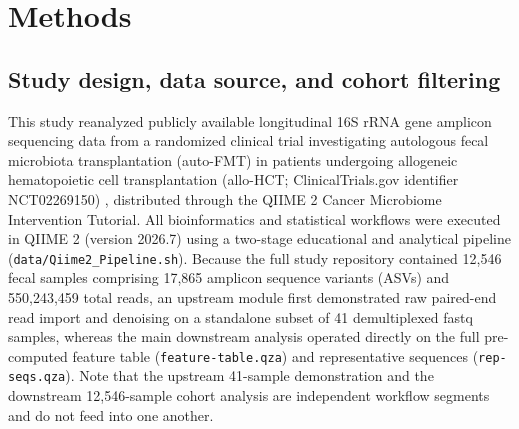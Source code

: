 
\section{Methods}

\subsection{Study design, data source, and cohort filtering}
This study reanalyzed publicly available longitudinal 16S rRNA gene amplicon sequencing data from a randomized clinical trial investigating autologous fecal microbiota transplantation (auto-FMT) in patients undergoing allogeneic hematopoietic cell transplantation (allo-HCT; ClinicalTrials.gov identifier NCT02269150) \citep{taur2018reconstitution}, distributed through the QIIME 2 Cancer Microbiome Intervention Tutorial. All bioinformatics and statistical workflows were executed in QIIME 2 (version 2026.7) \citep{bolyen2019reproducible} using a two-stage educational and analytical pipeline (\texttt{data/Qiime2\_Pipeline.sh}). Because the full study repository contained 12,546 fecal samples comprising 17,865 amplicon sequence variants (ASVs) and 550,243,459 total reads, an upstream module first demonstrated raw paired-end read import and denoising on a standalone subset of 41 demultiplexed fastq samples, whereas the main downstream analysis operated directly on the full pre-computed feature table (\texttt{feature-table.qza}) and representative sequences (\texttt{rep-seqs.qza}). Note that the upstream 41-sample demonstration and the downstream 12,546-sample cohort analysis are independent workflow segments and do not feed into one another.

